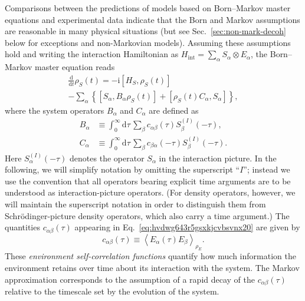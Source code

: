 \documentclass[aps,pra,reprint,amsmath,amssymb,showpacs,nofootinbib,floatfix,onecolumn,12pt]{revtex4-1}
\newcommand{\D}{\text{d}}
\newcommand{\I}{\text{i}}
\begin{document}
Comparisons between the predictions of models based on Born--Markov master equations and experimental data indicate that the Born and Markov assumptions are reasonable in many physical situations (but see Sec.~\ref{sec:non-mark-decoh} below for exceptions and non-Markovian models). Assuming these assumptions hold and writing the interaction Hamiltonian as $H_\text{int} = \sum_\alpha S_\alpha \otimes E_\alpha$, the Born--Markov master equation reads \cite{Breuer:2002:oq,Schlosshauer:2007:un}
%
\begin{multline}
\label{eq:born-markov-master}
\frac{\D}{\D t} \rho_S(t) = -\I \left[ H_S, \rho_S(t) \right] \\- \sum_{\alpha} \left\{ \left[
S_\alpha, B_\alpha \rho_S(t) \right] + \left[ \rho_S(t) C_\alpha, S_\alpha \right] \right\},
\end{multline}
%
where the system operators $B_\alpha$ and $C_\alpha$ are defined as
%
\begin{subequations} \label{eq:hvdwg643r5gsxkjcvbsvnx20}
\begin{align}
\label{eq:iuwrgf8}
B_\alpha &\equiv \int_0^\infty \D \tau \, \sum_{\beta}
c_{\alpha\beta}(\tau)  S^{(I)}_\beta(-\tau),
\\ \label{eq:112823jmn2} C_\alpha &\equiv \int_0^\infty \D \tau \,
\sum_{\beta} c_{\beta\alpha}(-\tau)  S^{(I)}_\beta(-\tau).
\end{align}
\end{subequations}
%
Here $S^{(I)}_\alpha(-\tau)$ denotes the operator $S_\alpha$ in the interaction picture. In the following, we will simplify notation by omitting the
superscript ``${I}$''; instead we use the convention that all operators bearing explicit time arguments are to be understood as interaction-picture operators. (For density operators, however, we will maintain the superscript notation in order to distinguish them from Schr\"odinger-picture density operators, which also carry a
time argument.) The quantities $c_{\alpha\beta}(\tau)$ appearing in Eq.~\eqref{eq:hvdwg643r5gsxkjcvbsvnx20} are given by
%
\begin{equation}
  \label{eq:pmpnnun12}
c_{\alpha\beta}(\tau) \equiv \left\langle E_\alpha(\tau) E_\beta
  \right\rangle_{\rho_E}.
\end{equation}
%
These \emph{environment self-correlation functions} quantify how much information the environment retains over time about its interaction with the system. The Markov approximation corresponds to the assumption of a rapid decay of the $c_{\alpha\beta}(\tau)$ relative to the timescale set by the evolution of the
system.
\end{document}
